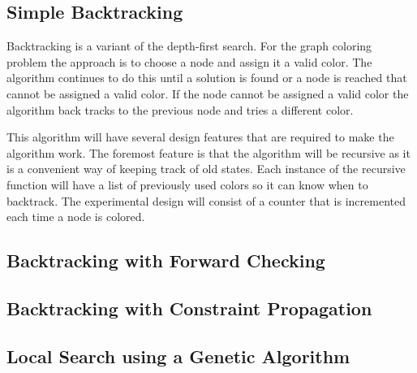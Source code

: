 \documentclass{article}
\begin{document}
\begin{multicols}{2}
\subsection{Simple Backtracking}
Backtracking is a variant of the depth-first search. For the graph coloring problem the approach is to choose a node and assign it a valid color. The algorithm continues to do this until a solution is found or a node is reached that cannot be assigned a valid color. If the node cannot be assigned a valid color the algorithm back tracks to the previous node and tries a different color.  \par
This algorithm will have several design features that are required to make the algorithm work. The foremost feature is that the algorithm will be recursive as it is a convenient way of keeping track of old states. Each instance of the recursive function will have a list of previously used colors so it can know when to backtrack. The experimental design will consist of a counter that is incremented each time a node is colored. 
\subsection{Backtracking with Forward Checking}
\subsection{Backtracking with Constraint Propagation}
\subsection{Local Search using a Genetic Algorithm}


\end{multicols}

	
	
\end{document}
